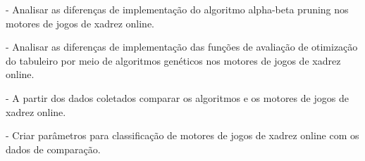 - Analisar as diferenças de implementação do algoritmo alpha-beta pruning nos motores de jogos de xadrez online.

- Analisar as diferenças de implementação das funções de avaliação de otimização do tabuleiro por meio de algoritmos genéticos nos motores de jogos de xadrez online.

- A partir dos dados coletados comparar os algoritmos e os motores de jogos de xadrez online.

- Criar parâmetros para classificação de motores de jogos de xadrez online com os dados de comparação.



